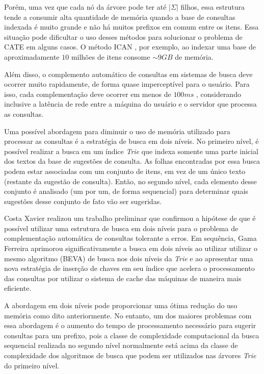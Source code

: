 Porém, uma vez que cada nó da árvore pode ter até $|\Sigma|$ filhos, essa estrutura tende a consumir alta quantidade de memória quando a base de consultas indexada é muito grande e não há muitos prefixos em comum entre os itens. Essa situação pode dificultar o uso desses métodos para solucionar o problema de CATE em alguns casos. O método ICAN \citep{ji2009efficient}, por exemplo, ao indexar uma base de aproximadamente $10$ milhões de itens consome $\sim9GB$ de memória. 

Além disso, o complemento automático de consultas em sistemas de busca deve ocorrer muito rapidamente, de forma quase imperceptível para o usuário. Para isso, cada complementação deve ocorrer em menos de $100ms$ \citep{ji2009efficient}, considerando inclusive a latência de rede entre a máquina do usuário e o servidor que processa as consultas.

Uma possível abordagem para diminuir o uso de memória utilizado para processar as consultas é a estratégia de busca em dois níveis. No primeiro nível, é possível realizar a busca em um índice \textit{Trie} que indexa somente uma parte inicial dos textos da base de sugestões de consulta. As folhas encontradas por essa busca podem estar associadas com um conjunto de itens, em vez de um único texto (restante da sugestão de consulta). Então, no segundo nível, cada elemento desse conjunto é analisado (um por um, de forma sequencial) para determinar quais sugestões desse conjunto de fato vão ser sugeridas. 

Costa Xavier \citep{xavier2019} realizou um trabalho preliminar que confirmou a hipótese de que é possível utilizar uma estrutura de busca em dois níveis para o problema de complementação automática de consultas tolerante a erros. Em sequência, Gama Ferreira \citep{berg2020} aprimorou significativamente a busca em dois níveis ao utilizar utilizar o mesmo algoritmo (BEVA) de busca nos dois níveis da \textit{Trie} e ao apresentar uma nova estratégia de inserção de chaves em seu índice que acelera o processamento das consultas por utilizar o sistema de cache das máquinas de maneira mais eficiente. %

A abordagem em dois níveis pode proporcionar uma ótima redução do uso memória como dito anteriormente. No entanto, um dos maiores problemas com essa abordagem é o aumento do tempo de processamento necessário para sugerir consultas para um prefixo, pois a classe de complexidade computacional da busca sequencial realizada no segundo nível normalmente está acima da classe de complexidade dos algoritmos de busca que podem ser utilizados nas árvores \textit{Trie} do primeiro nível.

